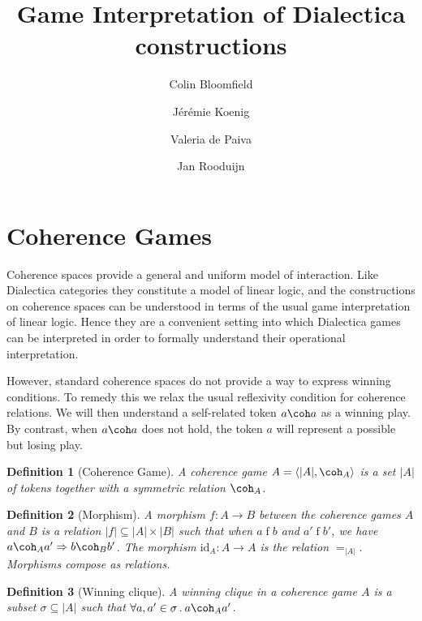 \documentclass{article}
\title{Game Interpretation of Dialectica constructions}
\author{
  Colin Bloomfield \and
  J\'er\'emie Koenig \and
  Valeria de Paiva \and
  Jan Rooduijn}
\newtheorem{definition}{Definition}
\begin{document}
\maketitle

\section{Coherence Games}

Coherence spaces provide a general and uniform model of interaction.
Like Dialectica categories they constitute a model of linear logic,
and the constructions on coherence spaces
can be understood in terms of the usual game interpretation of linear logic.
Hence they are a convenient setting into which
Dialectica games can be interpreted
in order to formally understand their operational interpretation.

However,
standard coherence spaces do not provide a way to
express winning conditions.
To remedy this we relax the usual reflexivity condition
for coherence relations.
We will then understand a self-related token $a \coh a$
as a winning play.
By contrast, when $a \coh a$ does not hold,
the token $a$ will represent a possible but losing play.

\begin{definition}[Coherence Game]
A coherence game $A = \langle |A|, {\coh_A} \rangle$
is a set $|A|$ of \emph{tokens}
together with a symmetric relation $\coh_A$.
\end{definition}

\begin{definition}[Morphism]
A morphism $f : A \rightarrow B$
between the coherence games $A$ and $B$
is a relation $|f| \subseteq |A| \times |B|$
such that
when $a \mathrel{f} b$ and $a' \mathrel{f} b'$,
we have $a \coh_A a' \Rightarrow b \coh_B b'$.
The morphism $\mathrm{id}_A : A \rightarrow A$
is the relation $=_{|A|}$.
Morphisms compose as relations.
\end{definition}

\begin{definition}[Winning clique]
A winning clique in a coherence game $A$
is a subset $\sigma \subseteq |A|$
such that
$\forall a, a' \in \sigma \mathbin{.} a \coh_A a'$.
\end{definition}
\end{document}
